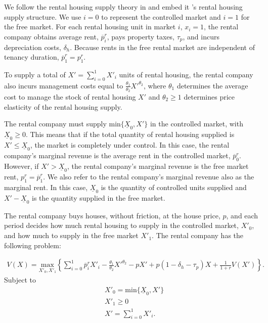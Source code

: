 \documentclass[parskip=full]{article}
\begin{document}
We follow the rental housing supply theory in \citet{fallis-1985} and embed it \citet{garrigaeetal-2009}'s rental housing supply structure. We use $i=0$ to represent the controlled market and $i=1$ for the free market. For each rental housing unit in market $i$, $x_{i}=1$, the rental company obtains average rent, $\overline{p}^{r}_{i}$, pays property taxes, $\tau_{p}$, and incurs depreciation costs, $\delta_{h}$. Because rents in the free rental market are independent of tenancy duration, $\overline{p}^{r}_{1}=p^{r}_{1}$. 

To supply a total of $X'=\sum^{1}_{i=0} X'_{i}$ units of rental housing, the rental company also incurs management costs equal to $\frac{\theta_{1}}{\theta_{2}}X'^{\theta_{2}}$, where $\theta_{1}$ determines the average cost to manage the stock of rental housing $X'$ and $\theta_{2}\geq 1$ determines price elasticity of the rental housing supply. 

The rental company must supply $\mbox{min}\{\underline{X}_{0},X'\}$ in the controlled market, with $\underline{X}_{0} \geq 0$. This means that if the total quantity of rental housing supplied is $X'\leq \underline{X}_{0}$, the market is completely under control. In this case, the rental company's marginal revenue is the average rent in the controlled market, $\overline{p}^{r}_{0}$. However, if $X'>\underline{X}_{0}$, the rental company's marginal revenue is the free market rent, $p^{r}_{1}=\overline{p}^{r}_{1}$. We also refer to the rental company's marginal revenue also as the marginal rent. In this case, $\underline{X}_{0}$ is the quantity of controlled units supplied and $X'-\underline{X}_{0}$ is the quantity supplied in the free market.

The rental company buys houses, without friction, at the house price, $p$, and each period decides how much rental housing to supply in the controlled market, $X'_{0}$, and how much to supply in the free market $X'_{1}$. The rental company has the following problem:

\begin{align}\label{eq:rental_company_problem}
V(X)=\underset{X'_{0},X'_{1}} {\text{$\mbox{max} $}}\left\{\sum_{i=0}^{1} \overline{p}^{r}_{i}X'_{i}-\frac{\theta_{1}}{\theta_{2}}X'^{\theta_{2}}-p X'+p(1-\delta_{h}-\tau_{p})X+\frac{1}{1+r}V(X')\right\}.
\end{align}
Subject to
\begin{align}
& X'_{0}=\mbox{min}\{\underline{X}_{0},X'\} \label{eq:supply_restriction} \\
& X'_{1} \geq 0 \label{eq:supply_positive} \\
& X'=\sum^{1}_{i=0} X'_{i}. \label{eq:total_supply} 
\end{align}
\end{document}
